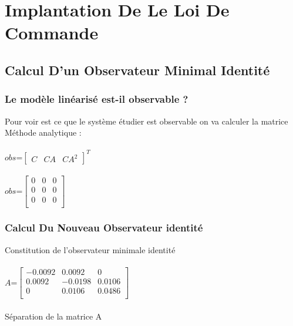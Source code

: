 \chapter{Implantation De Le Loi De Commande}
      
       
 
 
 \section{Calcul D’un Observateur Minimal Identité}

 \subsection{Le modèle linéarisé est-il observable ?}
 
 Pour voir est ce que le système étudier est observable   on va calculer la matrice \\
 Méthode analytique :\\\\
      $obs$=$\begin{bmatrix}
      C & CA & CA^{2}
      \end{bmatrix}^{T}$\\\\
      
      $obs$=$\begin{bmatrix}
      0 & 0 & 0 \\
      0 & 0 & 0 \\
      0 & 0 & 0 \\
      \end{bmatrix}$
 
 
 \subsection{Calcul Du Nouveau Observateur identité }
Constitution de l'observateur minimale identité\\\\
$A$=$\begin{bmatrix}
-0.0092 & 0.0092 & 0 \\
0.0092 & -0.0198 & 0.0106\\
0 & 0.0106 & 0.0486\\
\end{bmatrix}$\\\\
Séparation de la matrice A 

